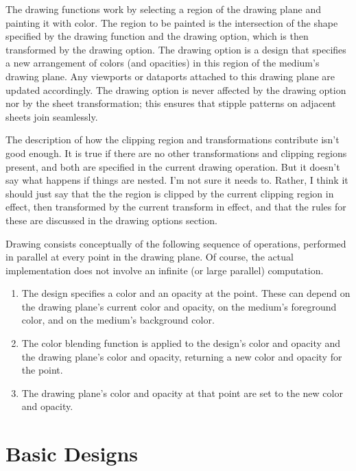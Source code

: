 The drawing functions work by selecting a region of the drawing plane and
painting it with color.  The region to be painted is the intersection of the
shape specified by the drawing function and the  drawing
option, which is then transformed by the  drawing option.
The  drawing option is a design that specifies a new arrangement of
colors (and opacities) in this region of the medium's drawing plane.  Any
viewports or dataports attached to this drawing plane are updated accordingly.
The  drawing option is never affected by the 
drawing option nor by the sheet transformation; this ensures that stipple
patterns on adjacent sheets join seamlessly.

 {The description of how the clipping region and transformations
contribute isn't good enough.  It is true if there are no other transformations
and clipping regions present, and both are specified in the current drawing
operation.  But it doesn't say what happens if things are nested.  I'm not sure
it needs to.  Rather, I think it should just say that the the region is clipped
by the current clipping region in effect, then transformed by the current
transform in effect, and that the rules for these are discussed in the drawing
options section.}

Drawing consists conceptually of the following sequence of operations, performed
in parallel at every point in the drawing plane.  Of course, the actual
implementation does not involve an infinite (or large parallel) computation.

\begin{enumerate}
\item The design specifies a color and an opacity at the point.  These can
depend on the drawing plane's current color and opacity, on the medium's
foreground color, and on the medium's background color.

\item The color blending function is applied to the design's color and opacity
and the drawing plane's color and opacity, returning a new color and opacity for
the point.

\item The drawing plane's color and opacity at that point are set to the new
color and opacity.
\end{enumerate}

\section {Basic Designs}

